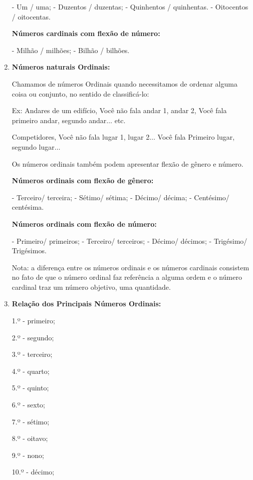 \begin{multicols*}{2}
\begin{enumerate}
		      - Um / uma;
		      - Duzentos / duzentas;
		      - Quinhentos / quinhentas.
		      - Oitocentos / oitocentas.

		      \textbf{Números cardinais com flexão de número:}

		      - Milhão / milhões;
		      - Bilhão / bilhões.

		\item \textbf{Números naturais Ordinais:}

		      Chamamos de números Ordinais quando necessitamos de ordenar alguma coisa ou conjunto, no sentido de classificá-lo:

		      Ex: 	Andares de um edifício, Você não fala andar 1, andar 2, Você fala primeiro andar, segundo andar$\dots$ etc.

		      Competidores, Você não fala lugar 1, lugar 2$\dots$ Você fala Primeiro lugar, segundo lugar$\dots$

		      Os números ordinais também podem apresentar flexão de gênero e número.

		      \textbf{Números ordinais com flexão de gênero:}

		      - Terceiro/ terceira;
		      - Sétimo/ sétima;
		      - Décimo/ décima;
		      - Centésimo/ centésima.

		      \textbf{Números ordinais com flexão de número:}

		      - Primeiro/ primeiros;
		      - Terceiro/ terceiros;
		      - Décimo/ décimos;
		      - Trigésimo/ Trigésimos.

		      Nota: a diferença entre os números ordinais e os números cardinais consistem no fato de que o número ordinal faz referência a alguma ordem e o número cardinal traz um número objetivo, uma quantidade.

		\item \textbf{Relação dos Principais Números Ordinais:}

		      1.º - primeiro;

		      2.º - segundo;

		      3.º - terceiro;

		      4.º - quarto;

		      5.º - quinto;

		      6.º - sexto;

		      7.º - sétimo;

		      8.º - oitavo;

		      9.º - nono;

		      10.º - décimo;


\end{enumerate}
\end{multicols*}
